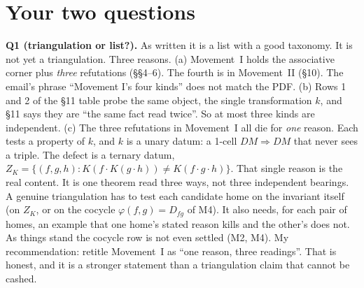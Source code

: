 \documentclass[11pt]{article}
\begin{document}
\section*{Your two questions}
\textbf{Q1 (triangulation or list?).} As written it is a list with a good taxonomy. It is not yet a
triangulation. Three reasons.
(a) Movement~I holds the associative corner plus \emph{three} refutations (\S\S4--6). The fourth is in
Movement~II (\S10). The email's phrase ``Movement I's four kinds'' does not match the PDF.
(b) Rows 1 and 2 of the \S11 table probe the same object, the single transformation $k$, and
\S11 says they are ``the same fact read twice''. So at most three kinds are independent.
(c) The three refutations in Movement~I all die for \emph{one} reason. Each tests a property of $k$,
and $k$ is a unary datum: a 1-cell $DM\Rightarrow DM$ that never sees a triple. The defect is a
ternary datum, $Z_K=\{(f,g,h):K(f\cdot K(g\cdot h))\neq K(f\cdot g\cdot h)\}$. That single
reason is the real content. It is one theorem read three ways, not three independent bearings.
A genuine triangulation has to test each candidate home on the invariant itself (on $Z_K$, or on the
cocycle $\varphi(f,g)=D_{fg}$ of M4). It also needs, for each pair of homes, an example that one
home's stated reason kills and the other's does not. As things stand the cocycle row is not even
settled (M2, M4). My recommendation: retitle Movement~I as ``one reason, three readings''. That is
honest, and it is a stronger statement than a triangulation claim that cannot be cashed.
\end{document}
